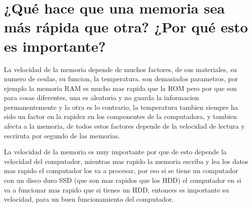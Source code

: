 \documentclass[a4paper]{article}
\begin{document}
\section{¿Qué hace que una memoria sea más rápida que otra? ¿Por qué esto es importante?}

La velocidad de la memoria depende de muchos factores, de sus materiales, su numero de ceulas, su funcion, la temperatura. son demasiados parametros, por ejemplo la memoria RAM es mucho mas rapida que la ROM pero por que son para cosas diferentes, una es aleatoria y no guarda la informacion permanentemente y la otra es lo contrario, la temperatura tambien siempre ha sido un factor en la rapidez en los componentes de la computadora, y tambien afecta a la memoria, de todos estos factores depende de la velocidad de lectura y escriruta por segundo de las memorias.

La velocidad de la memoria es muy importante por que de esto depende la velocidad del computador, mientras mas rapido la memoria escriba y lea los datos mas rapido el computador los va a procesar, por eso si se tiene un computador con un disco duro SSD (que son mas rapidos que los HDD) el computador en si va a funcionar mas rapido que si tienes un HDD, entonces es importante su velocidad, para un buen funcionamiento del computador.
\end{document}

